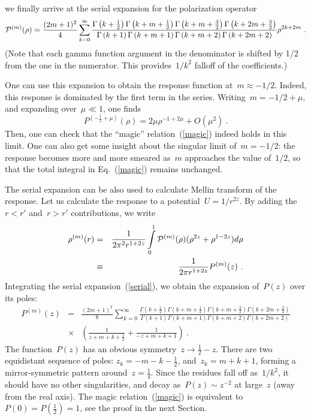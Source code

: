 \documentclass[preprint,aps,prb]{revtex4}
\begin{document}
we finally arrive at the serial expansion for the polarization operator
\begin{equation}
\label{serial}
{\cal P}^{(m)}(\rho) 
= \frac{(2m + 1)^2}{4}\sum_{k = 0}^{\infty} 
\frac{\Gamma\left(k + \frac{1}{2}\right) \Gamma\left(k + m + \frac{1}{2}\right)
      \Gamma\left(k + m + \frac{3}{2}\right) 
      \Gamma\left(k + 2m + \frac{3}{2}\right)
}{
\Gamma\left(k + 1\right) \Gamma\left(k + m + 1\right)
      \Gamma\left(k + m + 2\right) \Gamma\left(k + 2m + 2\right)
}
\rho^{2k + 2m} 
\ . 
\end{equation}
(Note that each gamma function argument  in the denominator is shifted by
1/2 from the one in the numerator. This provides~$1/k^2$ falloff of the
coefficients.) 

One can use this expansion to obtain the response function at~$m
\approx -1/2$. Indeed, this response is dominated by the first term
in the series. Writing~$m = -1/2 + \mu$, and expanding over~$ \mu \ll 1$, 
one finds
\begin{equation}
\label{minus-half}
P^{\left(-\frac{1}{2} + \mu\right)}(\rho) = 2 \mu \rho^{-1 + 2\mu} + O(\mu^2)
\ .
\end{equation}
Then, one can check that the ``magic'' relation~(\ref{magic}) indeed 
holds in this limit. 
One can also get some 
insight about the singular limit of~$m = -1/2$: 
the response becomes more and more
smeared as~$m$ approaches the value of~$1/2$, so that the total integral
in Eq.~(\ref{magic})
remains unchanged. 

The serial expansion can be also used to calculate Mellin transform of
the response. Let us calculate the response to a potential~$U = 1/r^{2z}$. 
By adding the~$r < r'$ and~$r > r'$ contributions, we write
\begin{eqnarray}
\rho^{(m)}(r) &=& \frac{1}{2\pi^2 r^{1 + 2z}} \int\limits_{0}^{1} 
{\cal P}^{(m)}(\rho) (\rho^{2z} + \rho^{1 - 2z}) d\rho 
\nonumber
\\
&\equiv& \frac{1}{2\pi r^{1 + 2z}} P^{(m)}(z)
\ .
\end{eqnarray}
Integrating the serial expansion~(\ref{serial}), we obtain the 
expansion of~$P(z)$ over its poles:
\begin{eqnarray}
P^{(m)}(z) &=& \frac{(2m + 1)^2}{8} 
\sum\limits_{k = 0}^{\infty}
\frac{\Gamma\left(k + \frac{1}{2}\right) \Gamma\left(k + m + \frac{1}{2}\right)
      \Gamma\left(k + m + \frac{3}{2}\right) 
      \Gamma\left(k + 2m + \frac{3}{2}\right)
}{
\Gamma\left(k + 1\right) \Gamma\left(k + m + 1\right)
      \Gamma\left(k + m + 2\right) \Gamma\left(k + 2m + 2\right)
} 
\nonumber
\\
&\times&
\left( \frac{1}{z + m + k + \frac{1}{2}} + \frac{1}{ - z + m + k + 1}   \right)
\ .
\end{eqnarray}
The function~$P(z)$ has an obvious symmetry~$z \to \frac{1}{2} - z$. 
There are two equidistant sequence of poles: $z_k = -m - k - \frac{1}{2}$,  
and~$z_k = m + k + 1$, forming a mirror-symmetric pattern around~$z = \frac{1}{4}$.
Since the  residues fall off as~$1/k^2$, it should have no other 
singularities,  and decay as~$P(z) \sim z^{-2}$ at large~$z$ (away from 
the real axis). The magic relation~(\ref{magic}) is equivalent 
to~$P(0) = P\left(\frac{1}{2}\right) = 1$, see the proof in the
next Section.
\end{document}
